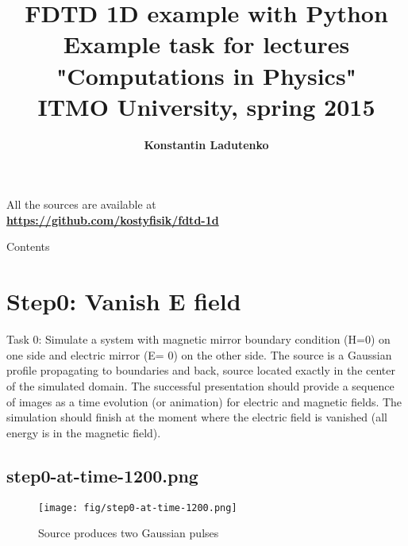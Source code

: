 \documentclass[fullscreen=true]{beamer}
\begin{document}
\title[\textbf{FDTD 1D example with Python}]{\textbf{FDTD 1D example
    with Python}\\{\small Example task for lectures "Computations in Physics" 
\\ ITMO University, spring 2015}
}

\author[k.ladutenko@metalab.ifmo.ru]{\textbf{Konstantin Ladutenko}%
}

\begin{frame}{}
  \titlepage
  \begin{center}
    All the sources are available at\\
    \textbf{\href{https://github.com/kostyfisik/fdtd-1d}{https://github.com/kostyfisik/fdtd-1d}}
  \end{center}
\end{frame}

\begin{frame}{Contents} %
\begin{multicols}{2}
  \tableofcontents%
\end{multicols}
\end{frame}
\section{Step0: Vanish E field}

\begin{frame}
  \begin{block}{Task 0:}
    Simulate a system with magnetic mirror boundary condition (H=0) on
    one side and electric mirror (E= 0) on the other side. The source
    is a Gaussian profile propagating to boundaries and back, source
    located exactly in the center of the simulated domain. The
    successful presentation should provide a sequence of images as a
    time evolution (or animation) for electric and magnetic
    fields. The simulation should finish at the moment where the
    electric field is vanished (all energy is in the magnetic field).
  \end{block}
\end{frame}

\subsection{step0-at-time-1200.png}
\begin{frame}
  \begin{figure}
    \texttt{[image: fig/step0-at-time-1200.png]}%
    \caption{Source produces two Gaussian pulses}
  \end{figure}
\end{frame}
\end{document}
